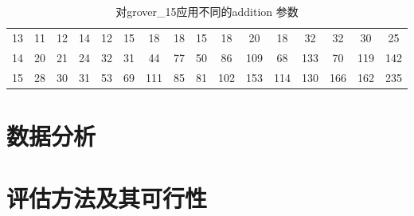 \begin{table}[!htbp]
\begin{tabular}{c|ccccccccccccccc}
    \rowcolor[HTML]{8DB4E2} 
    \cellcolor[HTML]{FFFFFF}13 & 11                                               & 12                          & 14                          & 12                          & 15                          & 18                                               & 18                         & 15                          & 18                          & 20                          & 18                          & 32                          & 32                          & 30                          & 25                          \\
    \rowcolor[HTML]{8DB4E2} 
    \cellcolor[HTML]{FFFFFF}14 & 20                                               & 21                          & 24                          & 32                          & 31                          & 44                                               & 77                         & 50                          & 86                          & \cellcolor[HTML]{538DD5}109 & 68                          & \cellcolor[HTML]{538DD5}133 & 70                          & \cellcolor[HTML]{538DD5}119 & \cellcolor[HTML]{538DD5}142 \\
    \rowcolor[HTML]{538DD5} 
    \cellcolor[HTML]{FFFFFF}15 & \cellcolor[HTML]{8DB4E2}28                       & \cellcolor[HTML]{8DB4E2}30  & \cellcolor[HTML]{8DB4E2}31  & \cellcolor[HTML]{8DB4E2}53  & \cellcolor[HTML]{8DB4E2}69  & 111                                              & \cellcolor[HTML]{8DB4E2}85 & \cellcolor[HTML]{8DB4E2}81  & 102                         & 153                         & 114                         & 130                         & 166                         & 162                         & 235                        
                     
    \end{tabular}
    \caption{对grover\_15应用不同的addition 参数}%
    \label{table:addition}
\end{table}

\section{数据分析}

\section{评估方法及其可行性}
